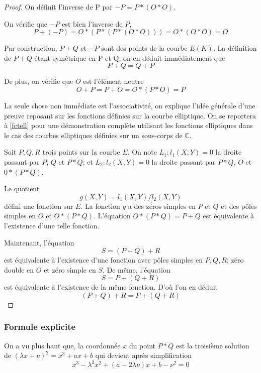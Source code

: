 \documentclass{article}
\begin{document}
\begin{proof}
On définit l'inverse de P par $-P = P*(O*O)$.

On vérifie que $-P$ est bien l'inverse de $P$,
\begin{equation*}
P + (-P) = O*(P*(P*(O*O))) = O*(O*O) = O
\end{equation*}

Par construction, $P + Q$ et $-P$ sont des points de la courbe $E(K)$.
La définition de $P+Q$ étant symétrique en P et Q, on en déduit immédiatement que
\begin{equation*}
P+Q=Q+P
\end{equation*}

De plus, on vérifie que $O$ est l'élément neutre
\begin{equation*}
O+P=P+O=O*(P*O)=P
\end{equation*}

La seule chose non immédiate est l'associativité, on explique l'idée générale d'une preuve reposant sur les fonctions définies sur la courbe elliptique. On se reportera à \ref{fctell} pour une
démonstration complète utilisant les fonctions elliptiques dans le cas des courbes elliptiques définies sur un sous-corps de $\mathbb{C}$.

Soit $P,Q,R$ trois points sur la courbe $E$. On note $L_1 : l_1(X,Y) = 0$ la droite passant par $P$, $Q$ et $P*Q$; et $L_2 : l_2(X,Y) = 0$ la droite passant par $P*Q$, $O$ et $0*(P*Q)$.

Le quotient $$g(X,Y) = l_1(X,Y)/l_2(X,Y)$$ défini une fonction sur $E$. La fonction $g$ a des zéros simples en $P$ et $Q$ et des pôles simples en $O$ et $O*(P*Q)$. L'équation $O*(P*Q) = P + Q$ est équivalente à l'existence d'une telle fonction.

Maintenant, l'équation
$$S = (P + Q) + R$$
est équivalente à l'existence d'une fonction avec pôles simples en $P,Q,R$; zéro double en $O$ et zéro simple en $S$. De même, l'équation
$$S = P + (Q + R)$$
est équivalente à l'existence de la même fonction. D'où l'on en déduit
$$(P + Q) + R = P + (Q + R)$$
\end{proof}

\subsubsection{Formule explicite}
On a vu plus haut que, la coordonnée $x$ du point $P*Q$ est la troisième solution de
$(\lambda x + \nu)^2 = x^3 + ax + b$ qui devient après simplification
\begin{equation*}
x^{3} - \lambda^{2}x^2 + (a-2\lambda \nu)x + b - \nu^2 = 0
\end{equation*}
\end{document}
